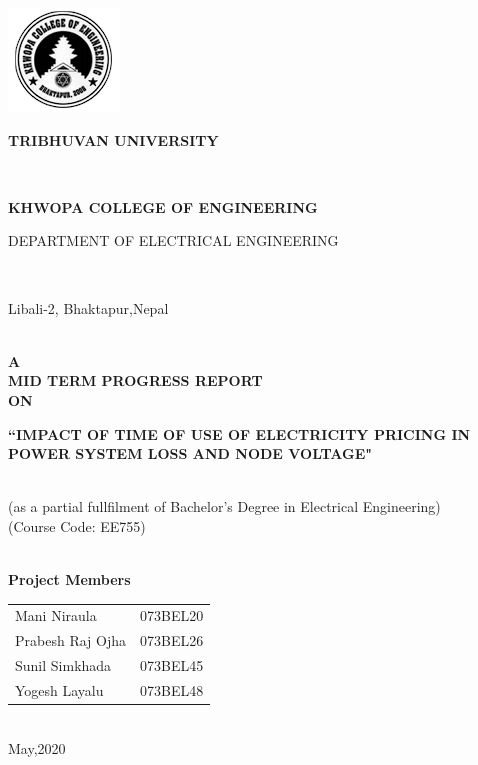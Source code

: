 \documentclass[12pt, a4paper]{article}
\begin{document}
\begin{titlepage}
	\centering
	\includegraphics[scale=2]{logo.PNG}
		\begin{center}	
		\begin{large}
			\textbf{TRIBHUVAN UNIVERSITY}
		\end{large}\\
		\begin{LARGE}
			\textbf{KHWOPA COLLEGE OF ENGINEERING}\\
			
		\end{LARGE}
		\begin{Large}
			DEPARTMENT OF ELECTRICAL ENGINEERING
		\end{Large}\\
		\bigskip
		\begin{large}
			Libali-2, Bhaktapur,Nepal
		\end{large}\\
		\vspace{1in}
		\textbf{\textsc{
			A\\
			MID TERM PROGRESS REPORT\\
			ON\\		
		}}
		\begin{LARGE}
			\textbf{``IMPACT OF TIME OF
			 USE OF ELECTRICITY PRICING IN POWER SYSTEM LOSS AND NODE VOLTAGE"}
		\end{LARGE}\\
			(as a partial fullfilment of Bachelor's Degree in Electrical Engineering)\\
			(Course Code: EE755)\\
		\vspace{1in}\
		\begin{large}
			\textbf{Project Members}\\
		\end{large}
		\begin{tabular}{ll}
			Mani Niraula & 073BEL20\\
			Prabesh Raj Ojha & 073BEL26\\
			Sunil Simkhada & 073BEL45\\
			Yogesh Layalu & 073BEL48\\
		\end{tabular}\\
		\vspace{1in}
		May,2020
		\end{center}
	\end{titlepage}
\end{document}
